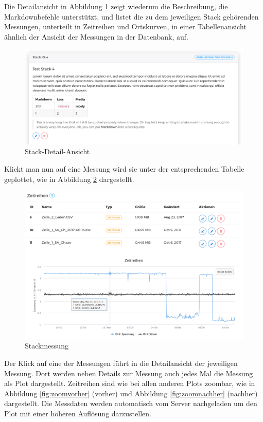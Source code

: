 Die Detailansicht in Abbildung \ref{fig:stack} zeigt wiederum die Beschreibung, die Markdownbefehle unterstützt, und listet die zu dem jeweiligen Stack gehörenden Messungen, unterteilt in Zeitreihen und Ortskurven, in einer Tabellenansicht ähnlich der Ansicht der Messungen in der Datenbank, auf.

\begin{figure}
\centering
\includegraphics[width=\textwidth]{Figures/stack}
\caption{Stack-Detail-Ansicht}
\label{fig:stack}
\end{figure}

Klickt man nun auf eine Messung wird sie unter der entsprechenden Tabelle geplottet, wie in Abbildung \ref{fig:stackmessung} dargestellt.

\begin{figure}
\centering
\includegraphics[width=\textwidth]{Figures/stackmessung}
\caption{Stackmessung}
\label{fig:stackmessung}
\end{figure}

Der Klick auf eine der Messungen führt in die Detailansicht der jeweiligen Messung. Dort werden neben Details zur Messung auch jedes Mal die Messung als Plot dargestellt. Zeitreihen sind wie bei allen anderen Plots zoombar, wie in Abbildung \ref{fig:zoomvorher} (vorher) und Abbildung \ref{fig:zoomnachher} (nachher) dargestellt. Die Messdaten werden automatisch vom Server nachgeladen um den Plot mit einer höheren Auflösung darzustellen.

